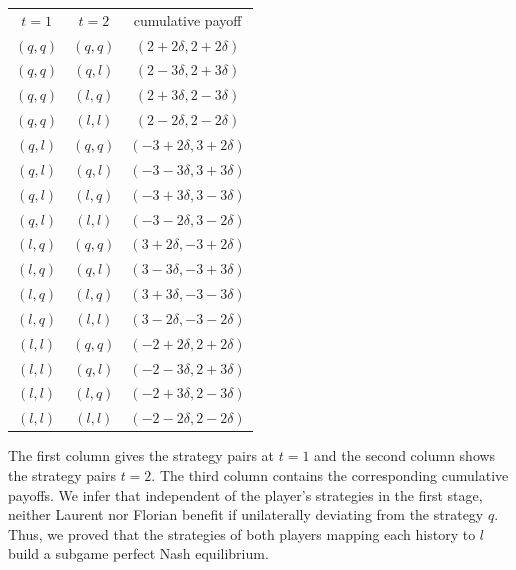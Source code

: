 \begin{example}
\begin{center}
\begin{tabular}{| c | c | c |}
            \cline{1 - 3}
            $t = 1$ & $t = 2$ & cumulative payoff \\
            \cline{1 - 3}
            $(q, q)$ & $(q, q)$ & $(2 + 2\delta, 2 + 2\delta)$ \\
            $(q, q)$ & $(q, l)$ & $(2 - 3\delta, 2 + 3\delta)$ \\
            $(q, q)$ & $(l, q)$ & $(2 + 3\delta, 2 - 3\delta)$ \\
            $(q, q)$ & $(l, l)$ & $(2 - 2\delta, 2 - 2\delta)$ \\
            \cline{1 - 3}
            $(q, l)$ & $(q, q)$ & $(-3 + 2\delta, 3 + 2\delta)$ \\
            $(q, l)$ & $(q, l)$ & $(-3 - 3\delta, 3 + 3\delta)$ \\
            $(q, l)$ & $(l, q)$ & $(-3 + 3\delta, 3 - 3\delta)$ \\
            $(q, l)$ & $(l, l)$ & $(-3 - 2\delta, 3 - 2\delta)$ \\
            \cline{1 - 3}
            $(l, q)$ & $(q, q)$ & $(3 + 2\delta, -3 + 2\delta)$ \\
            $(l, q)$ & $(q, l)$ & $(3 - 3\delta, -3 + 3\delta)$ \\
            $(l, q)$ & $(l, q)$ & $(3 + 3\delta, -3 - 3\delta)$ \\
            $(l, q)$ & $(l, l)$ & $(3 - 2\delta, -3 - 2\delta)$ \\
            \cline{1 - 3}
            $(l, l)$ & $(q, q)$ & $(-2 + 2\delta, 2 + 2\delta)$ \\
            $(l, l)$ & $(q, l)$ & $(-2 - 3\delta, 2 + 3\delta)$ \\
            $(l, l)$ & $(l, q)$ & $(-2 + 3\delta, 2 - 3\delta)$ \\
            $(l, l)$ & $(l, l)$ & $(-2 - 2\delta, 2 - 2\delta)$ \\
            \cline{1 - 3}
        \end{tabular}            
    \end{center}
    The first column gives the strategy pairs at $t = 1$ and the second column shows the strategy pairs $t = 2$. The third column contains the corresponding
    cumulative payoffs. We infer that independent of the player's strategies in the first stage, neither Laurent nor Florian benefit if unilaterally deviating
    from the strategy $q$. Thus, we proved that the strategies of both players mapping each history to $l$ build a subgame perfect Nash equilibrium.
\end{example}


